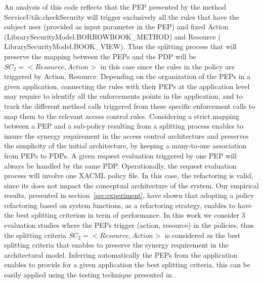 An analysis of this code reflects that the PEP presented by the method ServiceUtils.checkSecurity will trigger exclusively all the rules 
that have the subject user (provided as input parameter in the PEP) and fixed Action (LibrarySecurityModel.BORROWBOOK\_METHOD) and Resource ( LibrarySecurityModel.BOOK\_VIEW).
Thus the splitting process that will preserve the mapping between the PEPs and the PDP will be $SC_{2}=<Resource,Action>$ in this case since the rules in the policy are triggered 
by Action, Resource. Depending on the organization of the PEPs in a given application, connecting the rules with their PEPs at the application level may require to identify
 all the enforcements points in the application, and to track the different method calls triggered from these specific enforcement calls to map them to the relevant access control rules.
Considering a strict mapping between a PEP and a sub-policy resulting from a splitting process enables to insure the synergy requirement in the access control architecture 
and preserves the simplicity of the initial architecture, by keeping a many-to-one association from PEPs to PDPs. A given request evaluation 
triggered by one PEP will always be handled by the same PDP. Operationally, the request evaluation process will involve 
one XACML policy file. In this case, the refactoring is valid, since its does not impact the conceptual architecture of the system.
Our empirical results, presented in section~\ref{sec:experiment}, have shown that adopting a policy refactoring based on system functions, as a refactoring strategy, enables to 
have the best splitting criterion in term of performance. 
In this work we consider 3 evaluation studies where the PEPs trigger (action, resource) in the policies, thus the splitting criteria $SC_{2}=<Resource,Action>$ is considered as 
the best splitting criteria that enables to preserve the synergy requirement in the architectural model. Inferring automatically the PEPs from the application enables to provide for a given 
application the best splitting criteria, this can be easily applied using the testing technique presented in \cite{legacy}.


